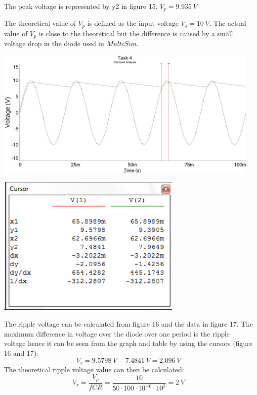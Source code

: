 \documentclass[11pt,a4paper]{article}
\begin{document}
\begin{enumerate}
    \vspace{2em}
        
    The peak voltage is represented by y2 in figure 15, $V_p = 9.935 \ V$ 
    
    The theoretical value of $V_p$ is defined as the input voltage $V_s = 10 \ V$. The actual value of $V_p$ is close to the theoretical but the difference is caused by a small voltage drop in the diode used in $MultiSim$. \\
    
    \begin{minipage}{\linewidth}
    	\centering
        \includegraphics[width=13cm]{4_3.jpg}
    \end{minipage}
    
    \begin{minipage}{\linewidth}
    	\centering
        \includegraphics[width=9cm]{table_4_2.png}
    \end{minipage}
    
    \vspace{2em}
    
	The ripple voltage can be calculated from figure 16 and the data in figure 17. The maximum difference in voltage over the diode over one period is the ripple voltage hence it can be seen from the graph and table by using the cursors (figure 16 and 17): $$ V_r = 9.5798\ V - 7.4841 \ V = 2.096 \ V$$
    The theoretical ripple voltage value can then be calculated: $$ V_r = \dfrac{V_p}{fCR} = \dfrac{10}{50 \cdot 100 \cdot 10^{-6} \cdot 10^3} = 2\ V$$
  

\end{enumerate}
\end{document}
